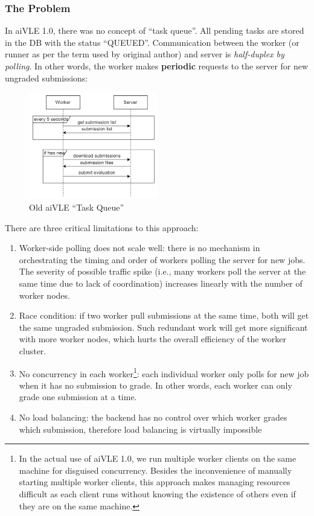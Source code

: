 \subsubsection{The Problem}
In aiVLE 1.0, there was no concept of ``task queue''. All pending tasks are stored in the DB with the status ``QUEUED''. Communication between the worker (or runner as per the term used by original author) and server is \textit{half-duplex by polling}. In other words, the worker makes \textbf{periodic} requests to the server for new ungraded submissions:
\begin{figure}[H]
    \centering
    \includegraphics[width=0.5\textwidth]{images/aivle-web-old-task-queue.png}
    \caption{Old aiVLE “Task Queue”}
    \label{fig:aivle-web-old-task-queue}
\end{figure}
There are three critical limitations to this approach:
\begin{enumerate}
    \item Worker-side polling does not scale well: there is no mechanism in orchestrating the timing and order of workers polling the server for new jobs. The severity of possible traffic spike (i.e., many workers poll the server at the same time due to lack of coordination) increases linearly with the number of worker nodes.
    \item Race condition: if two worker pull submissions at the same time, both will get the same ungraded submission. Such redundant work will get more significant with more worker nodes, which hurts the overall efficiency of the worker cluster.
    \item No concurrency in each worker\footnote{In the actual use of aiVLE 1.0, we run multiple worker clients on the same machine for disguised concurrency. Besides the inconvenience of manually starting multiple worker clients, this approach makes managing resources difficult as each client runs without knowing the existence of others even if they are on the same machine.\label{fn:worker-disguised-concurrency}}: each individual worker only polls for new job when it has no submission to grade. In other words, each worker can only grade one submission at a time.
    \item No load balancing: the backend has no control over which worker grades which submission, therefore load balancing is virtually impossible
\end{enumerate}

